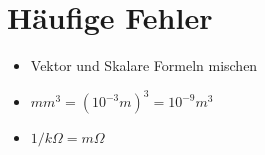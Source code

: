 \section{Häufige Fehler}

\begin{itemize}
  \item Vektor und Skalare Formeln mischen
  \item $mm^3 = (10^{-3} m)^3 = 10^{-9} m^3$
  \item $1/k\Omega = m\Omega$
\end{itemize}